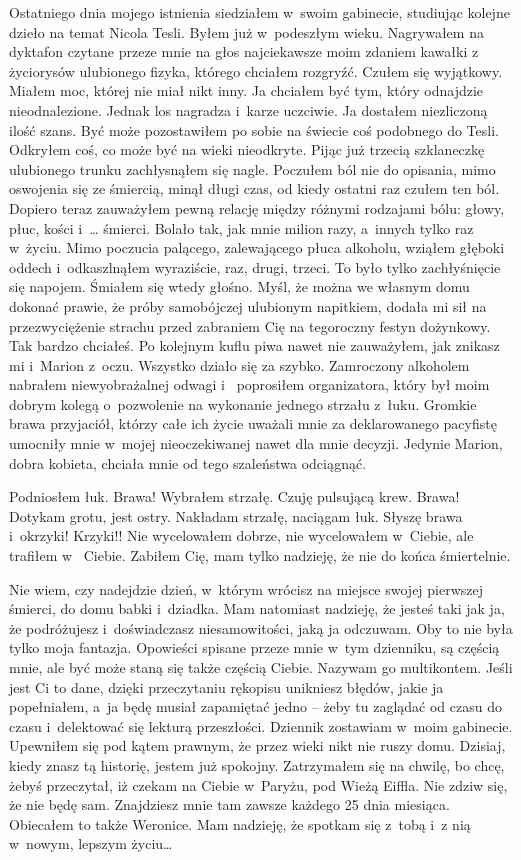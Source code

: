 Ostatniego dnia mojego istnienia siedziałem w~swoim gabinecie, studiując kolejne dzieło na temat Nicola Tesli. Byłem 
już w~podeszłym wieku. Nagrywałem na dyktafon czytane przeze mnie na głos najciekawsze moim zdaniem kawałki z~
życiorysów ulubionego fizyka, którego chciałem rozgryźć. Czułem się wyjątkowy. Miałem moc, której nie miał nikt inny. 
Ja chciałem być tym, który odnajdzie nieodnalezione. Jednak los nagradza i~karze uczciwie. Ja dostałem niezliczoną 
ilość szans. Być może pozostawiłem po sobie na świecie coś podobnego do Tesli. Odkryłem coś, co może być na wieki 
nieodkryte. Pijąc już trzecią szklaneczkę ulubionego trunku zachłysnąłem się nagle. Poczułem ból nie do opisania, 
mimo oswojenia się ze śmiercią, minął długi czas, od kiedy ostatni raz czułem ten ból. Dopiero teraz zauważyłem pewną 
relację między różnymi rodzajami bólu: głowy, płuc, kości i~… śmierci. Bolało tak, jak mnie milion razy, a~innych 
tylko raz w~życiu. Mimo poczucia palącego, zalewającego płuca alkoholu, wziąłem głęboki oddech i~odkaszlnąłem 
wyraziście, raz, drugi, trzeci. To było tylko zachłyśnięcie się napojem. Śmiałem się wtedy głośno. Myśl, że można we 
własnym domu dokonać prawie, że próby samobójczej ulubionym napitkiem, dodała mi sił na przezwyciężenie strachu przed 
zabraniem Cię na tegoroczny festyn dożynkowy. Tak bardzo chciałeś. Po kolejnym kuflu piwa nawet nie zauważyłem, jak 
znikasz mi i~Marion z~oczu. Wszystko działo się za szybko. Zamroczony alkoholem nabrałem niewyobrażalnej odwagi i~
poprosiłem organizatora, który był moim dobrym kolegą o~pozwolenie na wykonanie jednego strzału z~łuku. Gromkie brawa 
przyjaciół, którzy całe ich życie uważali mnie za deklarowanego pacyfistę umocniły mnie w~mojej nieoczekiwanej nawet 
dla mnie decyzji. Jedynie Marion, dobra kobieta, chciała mnie od tego szaleństwa odciągnąć.

Podniosłem łuk. Brawa! Wybrałem strzałę. Czuję pulsującą krew. Brawa! Dotykam grotu, jest ostry. Nakładam strzałę, 
naciągam łuk. Słyszę brawa i~okrzyki! Krzyki!! Nie wycelowałem dobrze, nie wycelowałem w~Ciebie, ale trafiłem w~
Ciebie. Zabiłem Cię, mam tylko nadzieję, że nie do końca śmiertelnie.

\paraSep

Nie wiem, czy nadejdzie dzień, w~którym wrócisz na miejsce swojej pierwszej śmierci, do domu babki i~dziadka. Mam 
natomiast nadzieję, że jesteś taki jak ja, że podróżujesz i~doświadczasz niesamowitości, jaką ja odczuwam. Oby to nie 
była tylko moja fantazja. Opowieści spisane przeze mnie w~tym dzienniku, są częścią mnie, ale być może staną się 
także częścią Ciebie. Nazywam go multikontem. Jeśli jest Ci to dane, dzięki przeczytaniu rękopisu unikniesz błędów, 
jakie ja popełniałem, a~ja będę musiał zapamiętać jedno – żeby tu zaglądać od czasu do czasu i~delektować się lekturą 
przeszłości. Dziennik zostawiam w~moim gabinecie. Upewniłem się pod kątem prawnym, że przez wieki nikt nie ruszy 
domu. Dzisiaj, kiedy znasz tą historię, jestem już spokojny. Zatrzymałem się na chwilę, bo chcę, żebyś przeczytał, iż 
czekam na Ciebie w~Paryżu, pod Wieżą Eiffla. Nie zdziw się, że nie będę sam. Znajdziesz mnie tam zawsze każdego 25 
dnia miesiąca. Obiecałem to także Weronice. Mam nadzieję, że spotkam się z~tobą i~z nią w~nowym, lepszym życiu…

